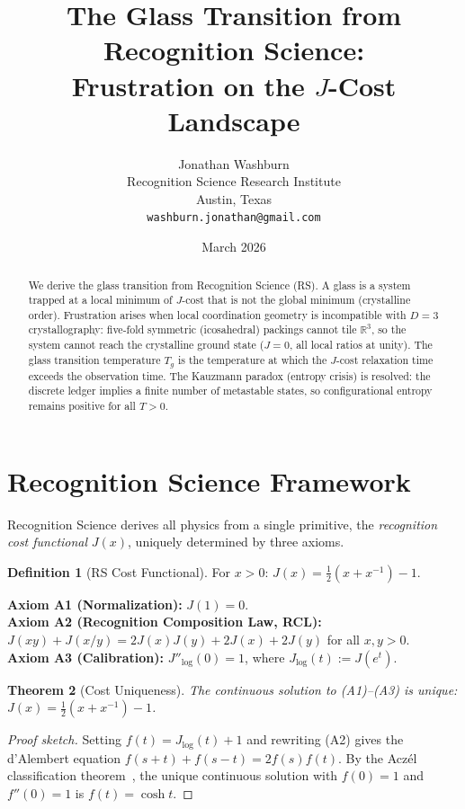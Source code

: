 \documentclass[12pt,a4paper]{article}
\title{The Glass Transition from Recognition Science:\\
Frustration on the $J$-Cost Landscape}
\author{Jonathan Washburn\\
Recognition Science Research Institute\\
Austin, Texas\\
\texttt{washburn.jonathan@gmail.com}}
\date{March 2026}
\newtheorem{theorem}{Theorem}[section]
\theoremstyle{definition}
\newtheorem{definition}[theorem]{Definition}
\theoremstyle{remark}
\begin{document}
\maketitle

\begin{abstract}
We derive the glass transition from Recognition Science (RS).  A glass
is a system trapped at a local minimum of $J$-cost that is not the
global minimum (crystalline order).  Frustration arises when local
coordination geometry is incompatible with $D = 3$ crystallography:
five-fold symmetric (icosahedral) packings cannot tile
$\mathbb{R}^3$, so the system cannot reach the
crystalline ground state ($J = 0$, all local ratios at unity).  The glass transition temperature $T_g$ is
the temperature at which the $J$-cost relaxation time exceeds the
observation time.  The Kauzmann paradox (entropy crisis) is resolved:
the discrete ledger implies a finite number of metastable states, so
configurational entropy remains positive for all $T > 0$.
\end{abstract}

\section{Recognition Science Framework}
\label{sec:framework}

Recognition Science derives all physics from a single primitive,
the \emph{recognition cost functional} $J(x)$, uniquely determined
by three axioms.

\begin{definition}[RS Cost Functional]
For $x > 0$: $J(x) = \tfrac{1}{2}(x + x^{-1}) - 1$.
\end{definition}

\noindent\textbf{Axiom A1 (Normalization):} $J(1) = 0$.\\
\textbf{Axiom A2 (Recognition Composition Law, RCL):}
$J(xy) + J(x/y) = 2J(x)J(y) + 2J(x) + 2J(y)$ for all $x, y > 0$.\\
\textbf{Axiom A3 (Calibration):} $J''_{\log}(0) = 1$, where
$J_{\log}(t) := J(e^t)$.

\begin{theorem}[Cost Uniqueness]
\label{thm:RS-unique}
The continuous solution to \textup{(A1)--(A3)} is unique:
$J(x) = \tfrac{1}{2}(x + x^{-1}) - 1$.
\end{theorem}

\begin{proof}[Proof sketch]
Setting $f(t) = J_{\log}(t) + 1$ and rewriting \textup{(A2)} gives the
d'Alembert equation $f(s+t) + f(s-t) = 2f(s)f(t)$.  By the Acz\'el
classification theorem~\cite{Aczel1966}, the unique continuous solution
with $f(0) = 1$ and $f''(0) = 1$ is $f(t) = \cosh t$.
\end{proof}
\end{document}
